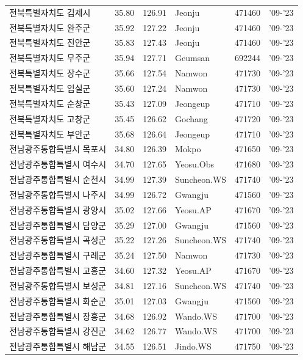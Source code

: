 \begin{longtable}{lcclcc}
  전북특별자치도 김제시 & 35.80 & 126.91 & Jeonju & 471460 & '09-'23 \\
  전북특별자치도 완주군 & 35.92 & 127.22 & Jeonju & 471460 & '09-'23 \\
  전북특별자치도 진안군 & 35.83 & 127.43 & Jeonju & 471460 & '09-'23 \\
  전북특별자치도 무주군 & 35.94 & 127.71 & Geumsan & 692244 & '09-'23 \\
  전북특별자치도 장수군 & 35.66 & 127.54 & Namwon & 471730 & '09-'23 \\
  전북특별자치도 임실군 & 35.60 & 127.24 & Namwon & 471730 & '09-'23 \\
  전북특별자치도 순창군 & 35.43 & 127.09 & Jeongeup & 471710 & '09-'23 \\
  전북특별자치도 고창군 & 35.45 & 126.62 & Gochang & 471720 & '09-'23 \\
  전북특별자치도 부안군 & 35.68 & 126.64 & Jeongeup & 471710 & '09-'23 \\
  전남광주통합특별시 목포시 & 34.80 & 126.39 & Mokpo & 471650 & '09-'23 \\
  전남광주통합특별시 여수시 & 34.70 & 127.65 & Yeosu.Obs & 471680 & '09-'23 \\
  전남광주통합특별시 순천시 & 34.99 & 127.39 & Suncheon.WS & 471740 & '09-'23 \\
  전남광주통합특별시 나주시 & 34.99 & 126.72 & Gwangju & 471560 & '09-'23 \\
  전남광주통합특별시 광양시 & 35.02 & 127.66 & Yeosu.AP & 471670 & '09-'23 \\
  전남광주통합특별시 담양군 & 35.29 & 127.00 & Gwangju & 471560 & '09-'23 \\
  전남광주통합특별시 곡성군 & 35.22 & 127.26 & Suncheon.WS & 471740 & '09-'23 \\
  전남광주통합특별시 구례군 & 35.24 & 127.50 & Namwon & 471730 & '09-'23 \\
  전남광주통합특별시 고흥군 & 34.60 & 127.32 & Yeosu.AP & 471670 & '09-'23 \\
  전남광주통합특별시 보성군 & 34.81 & 127.16 & Suncheon.WS & 471740 & '09-'23 \\
  전남광주통합특별시 화순군 & 35.01 & 127.03 & Gwangju & 471560 & '09-'23 \\
  전남광주통합특별시 장흥군 & 34.68 & 126.92 & Wando.WS & 471700 & '09-'23 \\
  전남광주통합특별시 강진군 & 34.62 & 126.77 & Wando.WS & 471700 & '09-'23 \\
  전남광주통합특별시 해남군 & 34.55 & 126.51 & Jindo.WS & 471750 & '09-'23 \\

\end{longtable}
